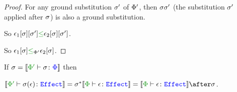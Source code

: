 \documentclass{report}
\begin{document}
\begin{framed}  
    \begin{proof}
        For any ground substitution $\si'$ of $\P'$, then $\si\si'$ (the substitution $\si'$ applied after $\si$) is also a ground substitution.
        
        So $\e_1\ssi\sub{\si'}\subeffect\e_2\ssi\sub{\si'}$. 
        
        So $\e_1\ssi\subeffect_{\P'}\e_2\ssi$.
        
    \end{proof}
\end{framed}

\begin{theorem}
    If $\si = \deno{\typerelation{\P'}{\si}{\P}}$ then 
    
    $\deno{\typerelation{\P'}{\si(\e)}{\effect}} = \si\star\deno{\typerelation{\P}{\e}{\effect}} = \deno{\typerelation{\P}{\e}{\effect}}\after\si$.
\end{theorem}
\end{document}
